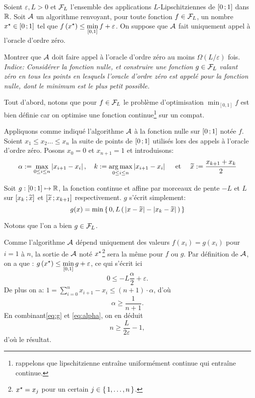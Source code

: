 \begin{exo}
Soient $\varepsilon, L>0$ et $\mathcal { F } _ { L }$ l'ensemble des applications $L$-Lipschitziennes de $\mathopen{[}0\mathpunct{};1\mathclose{]}$
 dans $\mathbb{R}$. Soit $\mathcal{A}$ un algorithme renvoyant, pour toute fonction $ f \in \mathcal { F } _ { L }$,
  un nombre $\xopt \in \intff{0}{1}$ tel que $\displaystyle f \left( \xopt \right) \leq \min _ { [ 0,1 ] } f + \varepsilon$. On suppose que $\mathcal{A}$ fait uniquement appel à l’oracle d’ordre zéro.
\end{exo}

\begin{qst}
Montrer que $\mathcal{A}$ doit faire appel à l’oracle d’ordre zéro au moins $\Omega ( L / \varepsilon )$ fois. \textit{Indice: Considérer la fonction nulle, et construire une fonction $g \in \mathcal { F } _ { L }$ valant zéro en tous les points en lesquels l’oracle d’ordre zéro est appelé pour la fonction nulle, dont le minimum est le plus petit possible.}
\end{qst}

\begin{rep}

Tout d'abord, notons que pour $ f \in \mathcal { F } _ { L }$ le problème d'optimisation $ \displaystyle \min _ { [ 0,1 ] } f$ est bien définie car on optimise une fonction continue\footnote{rappelons que lipschitzienne entraîne uniformément continue qui entraîne continue.} sur un compat.

Appliquons comme indiqué l'algorithme $\mathcal{A}$ à la fonction nulle sur $\mathopen{[}0\mathpunct{};1\mathclose{]}$ notée $f$. Soient $x_1 \leq x_2 \ldots \leq x_n$ la suite de points de $\mathopen{[}0\mathpunct{};1\mathclose{]}$ utilisés lors des appels à l'oracle d'ordre zéro. Posons $x_0 = 0$ et $x_{n+1}=1$ et introduisons:
  $$\alpha := \max_{0\leq i \leq n} \abs{x_{i+1}-x_{i}}
  , \quad  k := \argmax_{0\leq i \leq n} \abs{x_{i+1}-x_{i}}
  \quad \text{ et } \quad \xtilde := \frac{x_{k+1}+x_{k}}{2}
  $$

  Soit $g:\mathopen{[}0\mathpunct{};1\mathclose{]} \mapsto \mathbb{R}$, la fonction continue et affine par morceaux de pente
  $-L$ et $L$ sur $\mathopen{[}x_k\mathpunct{};\widetilde{x}\mathclose{]}$ et $\mathopen{[}\widetilde{x}\mathpunct{};x_{k+1}\mathclose{]}$ respectivement. $g$
  s'écrit simplement:
  $$g(x)= \min \acc{ 0,L\prt{\abs{x-\xtilde} - \abs{x_k-\xtilde}} }$$

Notons que l'on a bien $g\in \mathcal { F } _ { L }$.

  Comme l'algorithme $\mathcal{A}$ dépend uniquement des valeurs $f(x_i)=g(x_i)$ pour $i=1$ à $n$,
  la sortie de $\mathcal{A}$ noté $\xopt$\footnote{$\xopt=x_{j}$ pour un certain $j\in \left \{ \, 1,\ldots,n \, \right \}$.}  sera la même pour $f$ ou $g$. Par définition de $\mathcal{A}$, on a que :
   $ \displaystyle g \left( \xopt \right) \leq \min _ { [ 0,1 ] } g + \varepsilon$,
 ce qui s'écrit ici
 \begin{equation}\label{eq:g}
   0 \leq -L \frac{\alpha}{2} + \varepsilon.
 \end{equation}
   De plus on a: $ 1= \sum_{i=0}^n x_{i+1}-x_i \leq (n+1) \cdot \alpha$,
   d'où
\begin{equation}\label{eq:alpha}
\alpha \geq \frac{1}{n+1}.
\end{equation}
   En combinant\eqref{eq:g} et \eqref{eq:alpha}, on en déduit
   \begin{equation}
     n \geq \frac{L}{2 \varepsilon}-1,
   \end{equation}
   d'où le résultat.
\end{rep}



